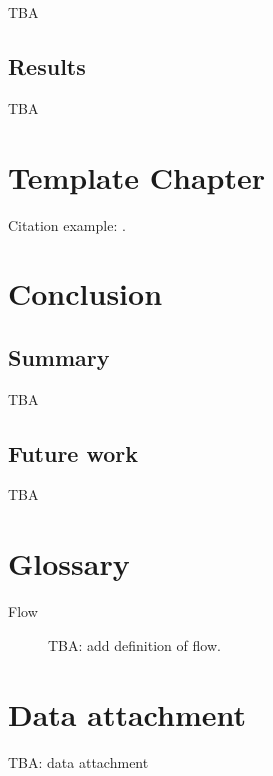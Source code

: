 \documentclass[
    digital,    %
    oneside,    %
    color,
    11pt,
    nocover,
    notable,
    nolof,
    nolot,
    final
]{fithesis3}
\begin{document}
TBA


\section{Results}

TBA



\chapter{Template Chapter}
\label{chap:template}

Citation example: \cite{adaptive-practice}.


\chapter{Conclusion}
\label{chap:conclusion}

\section{Summary}
\label{sec:conclusion.summary}

TBA

\section{Future work}
\label{sec:conclusion.future-work}

TBA



\printbibliography[heading=bibintoc]

\appendix

\chapter{Glossary}
\label{chap:glossary}

\begin{description}
    \item[Flow] TBA: add definition of flow.
\end{description}

\chapter{Data attachment}
\label{chap:data}

TBA: data attachment
\end{document}
